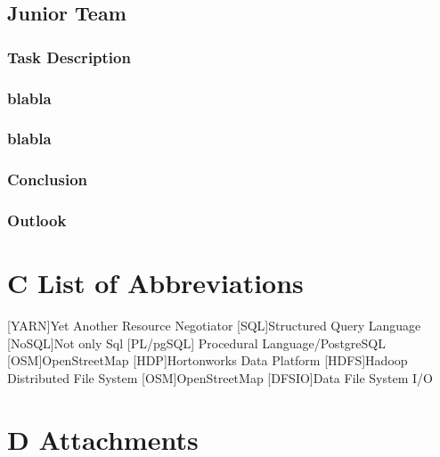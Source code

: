 \documentclass[12pt]{article}
\renewcommand{\listfigurename}{\begingroup
\tocchapter
\tocfile{\listoffigurename}{B Illustration Directory}
\endgroup}
\begin{document}
\subsection{Junior Team}
\subsubsection{Task Description}
\subsubsection{blabla}
\subsubsection{blabla}
\subsubsection{Conclusion}
\subsubsection{Outlook}
\newpage


\renewcommand{\listfigurename}{B Illustration Directory}
\listoffigures
\section*{C List of Abbreviations}
\begin{acronym}
[YARN]{Yet Another Resource Negotiator}
 [SQL]{Structured Query Language}
 [NoSQL]{Not only Sql}
[PL/pgSQL] {Procedural Language/PostgreSQL}
[OSM]{OpenStreetMap}
[HDP]{Hortonworks Data Platform}
 [HDFS]{Hadoop Distributed File System}
[OSM]{OpenStreetMap}
[DFSIO]{Data File System I/O}
\end{acronym}
\newpage
\section*{D Attachments}
\end{document}
